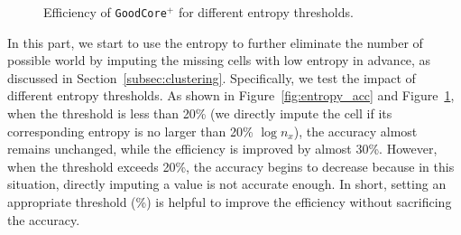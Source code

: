 \begin{figure}[t]
\begin{minipage}[t]{0.3\textwidth}
		\vspace{-1.5em}
		\caption{Efficiency of \texttt{GoodCore}$^+$ for different entropy thresholds.}
		\label{fig:entropy_time}
	\end{minipage}
	\vspace*{-1em}   
\end{figure}
%
In this part, we start to use the entropy to further eliminate the number of possible world by imputing the missing cells with low entropy in advance, as discussed in Section~\ref{subsec:clustering}. 
%
Specifically, we test the impact of different entropy thresholds. As shown in Figure~\ref{fig:entropy_acc} and Figure~\ref{fig:entropy_time}, when the threshold is less than  20\% (\ie we directly impute the cell if its corresponding entropy is no larger than 20\% $\log n_x$), the accuracy almost remains unchanged, while the efficiency is improved by almost 30\%. However, when the threshold exceeds 20\%, the accuracy begins to decrease because in this situation, directly imputing a value is not accurate enough. In short, setting an appropriate threshold (\%) is helpful to improve the efficiency without sacrificing the accuracy. 


%
